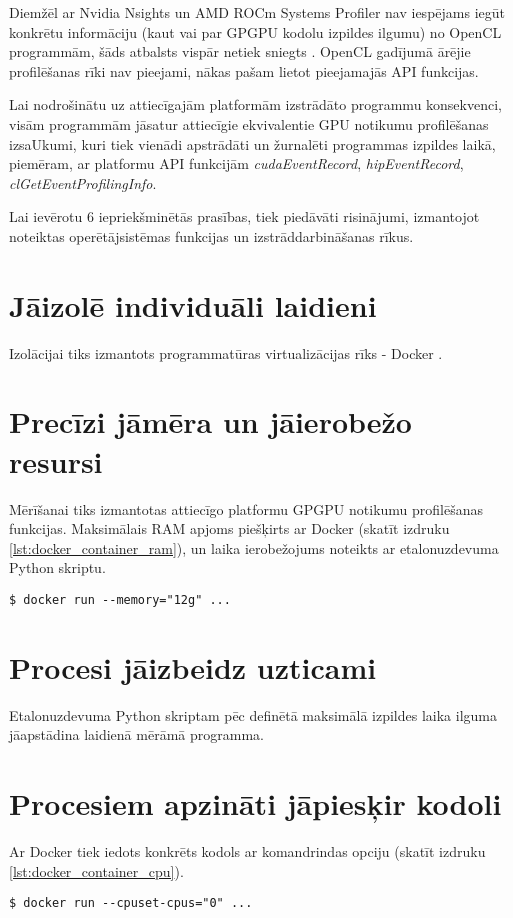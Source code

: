 Diemžēl ar Nvidia Nsights un AMD ROCm Systems Profiler nav iespējams iegūt
konkrētu informāciju (kaut vai par GPGPU kodolu izpildes ilgumu) no OpenCL
programmām, šāds atbalsts vispār netiek
sniegts \cite{rocm_sys_profiler_use_case}. OpenCL gadījumā ārējie profilēšanas
rīki nav pieejami, nākas pašam lietot pieejamajās API funkcijas.

Lai nodrošinātu uz attiecīgajām platformām izstrādāto
programmu konsekvenci, visām programmām jāsatur attiecīgie ekvivalentie GPU
notikumu profilēšanas izsaUkumi, kuri tiek vienādi apstrādāti un žurnalēti
programmas izpildes laikā, piemēram, ar platformu API funkcijām
\textit{cudaEventRecord}, \textit{hipEventRecord},
\textit{clGetEventProfilingInfo}.


Lai ievērotu 6 iepriekšminētās prasības, tiek piedāvāti risinājumi, izmantojot
noteiktas operētājsistēmas funkcijas un izstrāddarbināšanas rīkus.

\section{Jāizolē individuāli laidieni}
Izolācijai tiks izmantots programmatūras virtualizācijas rīks - Docker
\cite{docker-docs-engine}.

\section{Precīzi jāmēra un jāierobežo resursi}
Mērīšanai tiks izmantotas attiecīgo platformu GPGPU notikumu profilēšanas
funkcijas. Maksimālais RAM apjoms piešķirts ar Docker (skatīt izdruku
\ref{lst:docker_container_ram}), un laika ierobežojums noteikts ar etalonuzdevuma
Python skriptu.
\begin{lstlisting}[caption={Docker konteinera palaišana, piešķirot tam konkrēti
    12GiB RAM},
  captionpos=b,
label=lst:docker_container_ram]
$ docker run --memory="12g" ...
\end{lstlisting}

\section{Procesi jāizbeidz uzticami}
Etalonuzdevuma Python skriptam pēc definētā maksimālā izpildes laika ilguma
jāapstādina laidienā mērāmā programma.

\section{Procesiem apzināti jāpiesķir kodoli}
Ar Docker tiek iedots konkrēts kodols ar komandrindas opciju (skatīt izdruku
\ref{lst:docker_container_cpu}).
\begin{lstlisting}[caption={Docker konteinera palaišana, piešķirot tam konkrēti
    pirmo CPU kodolu}, captionpos=b,
    label=lst:docker_container_cpu]
$ docker run --cpuset-cpus="0" ...
\end{lstlisting}

